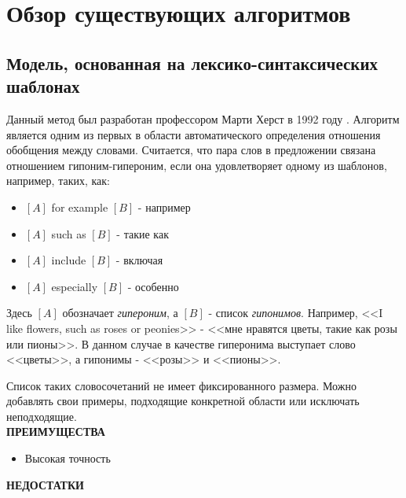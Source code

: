 \section{Обзор существующих алгоритмов}
\label{sec:Chapter_2} 
\large

\subsection{Модель, основанная на лексико-синтаксических шаблонах}

Данный метод был разработан профессором Марти Херст в 1992 году \cite{hearst1992}. Алгоритм является
одним из первых в области автоматического определения отношения обобщения между
словами. Считается, что пара слов в предложении связана отношением гипоним-гипероним, если она удовлетворяет одному из шаблонов, например, таких, как:

\begin{itemize}
\item $[A]$ for example $[B]$ - например
\item $[A]$ such as $[B]$ - такие как
\item $[A]$ include $[B]$ - включая
\item $[A]$ especially $[B]$ - особенно
\end{itemize}

Здесь $[A]$ обозначает \textit{гипероним}, а $[B]$ - список \textit{гипонимов}. Например, <<I like flowers, such as
roses or peonies>> - <<мне нравятся цветы, такие как розы или пионы>>. В данном случае в
качестве гиперонима выступает слово <<цветы>>, а гипонимы - <<розы>> и <<пионы>>.

Список таких словосочетаний не имеет фиксированного размера. Можно добавлять свои
примеры, подходящие конкретной области или исключать неподходящие.\\

\textbf{ПРЕИМУЩЕСТВА}

\begin{itemize}
\item Высокая точность
\end{itemize}

\textbf{НЕДОСТАТКИ}

